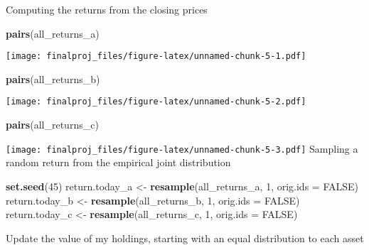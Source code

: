 \documentclass[]{article}
\newenvironment{Shaded}{\begin{snugshade}}{\end{snugshade}}
\newcommand{\DataTypeTok}[1]{\textcolor[rgb]{0.13,0.29,0.53}{#1}}
\newcommand{\DecValTok}[1]{\textcolor[rgb]{0.00,0.00,0.81}{#1}}
\newcommand{\KeywordTok}[1]{\textcolor[rgb]{0.13,0.29,0.53}{\textbf{#1}}}
\newcommand{\NormalTok}[1]{#1}
\newcommand{\OtherTok}[1]{\textcolor[rgb]{0.56,0.35,0.01}{#1}}
\newcommand{\StringTok}[1]{\textcolor[rgb]{0.31,0.60,0.02}{#1}}
\begin{document}
Computing the returns from the closing prices

\begin{Shaded}
\begin{Highlighting}[]
\KeywordTok{pairs}\NormalTok{(all_returns_a)}
\end{Highlighting}
\end{Shaded}

\texttt{[image: finalproj\_files/figure-latex/unnamed-chunk-5-1.pdf]}

\begin{Shaded}
\begin{Highlighting}[]
\KeywordTok{pairs}\NormalTok{(all_returns_b)}
\end{Highlighting}
\end{Shaded}

\texttt{[image: finalproj\_files/figure-latex/unnamed-chunk-5-2.pdf]}

\begin{Shaded}
\begin{Highlighting}[]
\KeywordTok{pairs}\NormalTok{(all_returns_c)}
\end{Highlighting}
\end{Shaded}

\texttt{[image: finalproj\_files/figure-latex/unnamed-chunk-5-3.pdf]}
Sampling a random return from the empirical joint distribution

\begin{Shaded}
\begin{Highlighting}[]
\KeywordTok{set.seed}\NormalTok{(}\DecValTok{45}\NormalTok{)}
\NormalTok{return.today_a <-}\StringTok{ }\KeywordTok{resample}\NormalTok{(all_returns_a, }\DecValTok{1}\NormalTok{, }\DataTypeTok{orig.ids =} \OtherTok{FALSE}\NormalTok{)}
\NormalTok{return.today_b <-}\StringTok{ }\KeywordTok{resample}\NormalTok{(all_returns_b, }\DecValTok{1}\NormalTok{, }\DataTypeTok{orig.ids =} \OtherTok{FALSE}\NormalTok{)}
\NormalTok{return.today_c <-}\StringTok{ }\KeywordTok{resample}\NormalTok{(all_returns_c, }\DecValTok{1}\NormalTok{, }\DataTypeTok{orig.ids =} \OtherTok{FALSE}\NormalTok{)}
\end{Highlighting}
\end{Shaded}

Update the value of my holdings, starting with an equal distribution to
each asset
\end{document}
